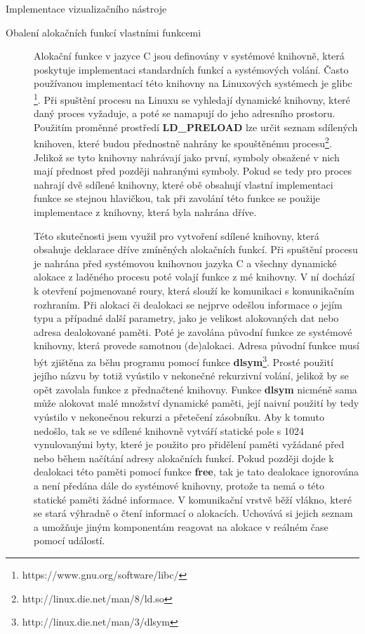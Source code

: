 \documentclass[bc,male,python,dept460]{diploma}						%
\newcommand{\parspace}[1][]{
	\ifthenelse{\isempty{#1}}{\vspace{5mm}}{\vspace{#1}}
	\par
}
\begin{document}
\begin{section}{Implementace vizualizačního nástroje}
\begin{description}
\begin{description}
				\item[Obalení alokačních funkcí vlastními funkcemi] Alokační funkce v jazyce C jsou definovány v systémové knihovně, která poskytuje
				implementaci standardních funkcí a systémových volání. Často používanou implementací této knihovny na Linuxových systémech je glibc
				\footnote{https://www.gnu.org/software/libc/}. Při spuštění procesu na Linuxu se vyhledají dynamické knihovny, které daný proces vyžaduje,
				a poté se namapují do jeho adresního prostoru. Použitím proměnné prostředí \textbf{LD\_PRELOAD} lze určit
				seznam sdílených knihoven, které budou přednostně nahrány ke spouštěnému procesu\footnote{http://linux.die.net/man/8/ld.so}.
				Jelikož se tyto knihovny nahrávají jako první, symboly obsažené v nich mají přednost před později nahranými symboly. Pokud se tedy pro proces
				nahrají dvě sdílené knihovny, které obě obsahují vlastní implementaci funkce se stejnou hlavičkou, tak při zavolání této funkce se použije
				implementace z knihovny, která byla nahrána dříve.
				
				\parspace Této skutečnosti jsem využil pro vytvoření sdílené knihovny, která obsahuje deklarace dříve zmíněných alokačních funkcí.
				Při spuštění procesu je nahrána před systémovou knihovnou jazyka C a všechny dynamické alokace z laděného procesu poté volají funkce z mé knihovny.
				V ní dochází k otevření pojmenované roury, která slouží ke komunikaci s komunikačním rozhraním. %
				Při alokaci či dealokaci se nejprve odešlou informace o jejím typu a případné další parametry, jako je velikost alokovaných dat
				nebo adresa dealokované paměti. Poté je zavolána původní funkce ze systémové knihovny, která provede samotnou (de)alokaci.
				Adresa původní funkce musí být zjištěna za běhu programu pomocí
				funkce \textbf{dlsym}\footnote{http://linux.die.net/man/3/dlsym}. Prosté použití jejího názvu by totiž vyústilo v nekonečné rekurzivní volání, jelikož
				by se opět zavolala funkce z přednačtené knihovny. Funkce \textbf{dlsym} nicméně sama může alokovat malé množství dynamické paměti,
				její naivní použití by tedy vyústilo v nekonečnou rekurzi a přetečení zásobníku.
				Aby k tomuto nedošlo, tak se ve sdílené knihovně vytváří statické pole s 1024 vynulovanými
				byty, které je použito pro přidělení paměti vyžádané před nebo během načítání adresy alokačních funkcí. Pokud později dojde k dealokaci této
				paměti pomocí funkce \textbf{free}, tak je tato dealokace ignorována a není předána dále do systémové knihovny, protože ta nemá o této statické paměti
				žádné informace. V komunikační vrstvě běží vlákno, které se stará výhradně o čtení informací o alokacích. Uchovává si jejich seznam
				a umožňuje jiným komponentám reagovat na alokace v reálném čase pomocí událostí.
				

\end{description}
\end{description}
\end{section}
\end{document}
